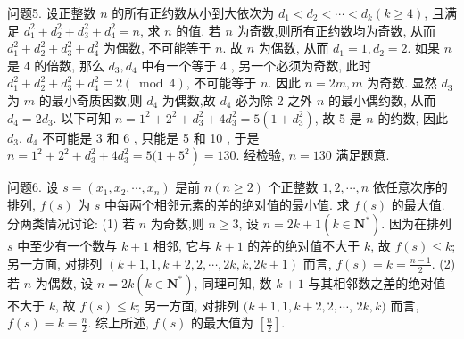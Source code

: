 问题5. 设正整数 $n$ 的所有正约数从小到大依次为 $d_1<d_2<\cdots<d_k(k \geqslant 4)$, 且满足 $d_1^2+d_2^2+d_3^2+d_4^2=n$, 求 $n$ 的值.
若 $n$ 为奇数,则所有正约数均为奇数, 从而 $d_1^2+d_2^2+d_3^2+d_4^2$ 为偶数, 不可能等于 $n$. 故 $n$ 为偶数, 从而 $d_1=1, d_2=2$.
如果 $n$ 是 4 的倍数, 那么 $d_3, d_4$ 中有一个等于 4 , 另一个必须为奇数, 此时 $d_1^2+d_2^2+d_3^2+d_4^2 \equiv 2(\bmod 4)$, 不可能等于 $n$. 因此 $n=2 m, m$ 为奇数.
显然 $d_3$ 为 $m$ 的最小奇质因数,则 $d_4$ 为偶数,故 $d_4$ 必为除 2 之外 $n$ 的最小偶约数, 从而 $d_4=2 d_3$.
以下可知 $n=1^2+2^2+d_3^2+4 d_3^2=5\left(1+d_3^2\right)$, 故 5 是 $n$ 的约数, 因此 $d_3$, $d_4$ 不可能是 3 和 6 , 只能是 5 和 10 , 于是 $n=1^2+2^2+d_3^2+4 d_3^2=5(1+ \left.5^2\right)=130$.
经检验, $n=130$ 满足题意.



问题6. 设 $s=\left(x_1, x_2, \cdots, x_n\right)$ 是前 $n(n \geqslant 2)$ 个正整数 $1,2, \cdots, n$ 依任意次序的排列, $f(s)$ 为 $s$ 中每两个相邻元素的差的绝对值的最小值.
求 $f(s)$ 的最大值.
分两类情况讨论:
(1) 若 $n$ 为奇数,则 $n \geqslant 3$, 设 $n=2 k+1\left(k \in \mathbf{N}^*\right)$. 因为在排列 $s$ 中至少有一个数与 $k+1$ 相邻, 它与 $k+1$ 的差的绝对值不大于 $k$, 故 $f(s) \leqslant k$; 另一方面, 对排列 $(k+1,1, k+2,2, \cdots, 2 k, k, 2 k+1)$ 而言, $f(s)=k=\frac{n-1}{2}$.
(2) 若 $n$ 为偶数, 设 $n=2 k\left(k \in \mathbf{N}^*\right)$, 同理可知, 数 $k+1$ 与其相邻数之差的绝对值不大于 $k$, 故 $f(s) \leqslant k$; 另一方面, 对排列 $(k+1,1, k+2,2, \cdots$, $2 k, k)$ 而言, $f(s)=k=\frac{n}{2}$.
综上所述, $f(s)$ 的最大值为 $\left[\frac{n}{2}\right]$.



